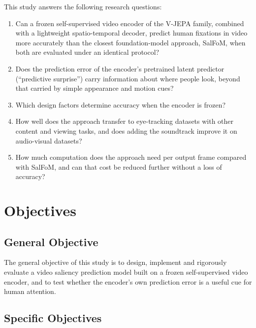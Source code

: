 This study answers the following research questions:
\begin{enumerate}[label=\textbf{RQ\arabic*.},leftmargin=*]
  \item Can a frozen self-supervised video encoder of the \acrshort{V-JEPA} family, combined
    with a lightweight spatio-temporal decoder, predict human fixations in video
    more accurately than the closest foundation-model approach, SalFoM, when both
    are evaluated under an identical protocol?
  \item Does the prediction error of the encoder's pretrained latent predictor
    (\enquote{predictive surprise}) carry information about where people look,
    beyond that carried by simple appearance and motion cues?
  \item Which design factors determine accuracy when the encoder is frozen?
  \item How well does the approach transfer to eye-tracking datasets with other
    content and viewing tasks, and does adding the soundtrack improve it on
    audio-visual datasets?
  \item How much computation does the approach need per output frame compared
    with SalFoM, and can that cost be reduced further without a loss of
    accuracy?
\end{enumerate}

\section{Objectives}\label{sec:objectives}


\subsection{General Objective}

The general objective of this study is to design, implement and rigorously
evaluate a video saliency prediction model built on a frozen self-supervised
video encoder, and to test whether the encoder's own prediction error is a
useful cue for human attention.

\subsection{Specific Objectives}

